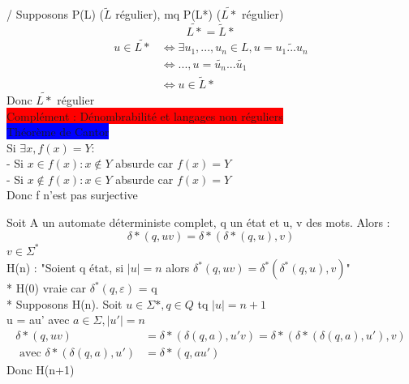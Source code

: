 \documentclass[a4paper,twocolumn,landscape]{article}
\begin{document}
/ Supposons P(L) (\(\tilde{L}\) régulier), mq P(L*) (\(\tilde{L*}\) régulier)\\
\begin{equation*}
    \tilde{L*} = \tilde{L}*
\end{equation*}
\begin{align*}
    u \in \tilde{L*} &\Leftrightarrow \exists u_1,...,u_n \in L, u = \tilde{u_1...u_n}\\
    &\Leftrightarrow ..., u = \tilde{u_n}...\tilde{u_1}\\
    &\Leftrightarrow u \in \tilde{L}*
\end{align*}
Donc \(\tilde{L*}\) régulier\\

\noindent \colorbox{red}{Complément : Dénombrabilité et langages non réguliers}\\
\colorbox{blue}{Théorème de Cantor} \\
Si \(\exists x, f(x) = Y\):\\
- Si \(x \in f(x): x\notin Y\) absurde car \(f(x) = Y\)\\
- Si \(x \notin f(x): x \in Y\) absurde car \(f(x) = Y\)\\
Donc f n'est pas surjective

\noindent
Soit A un automate déterministe complet, q un état et u, v des mots.
Alors :
\begin{equation*}
    \delta*(q, uv) = \delta*(\delta *(q, u), v)
\end{equation*}
\(v \in \Sigma^*\)\\
H(n) : "Soient q état, si \(|u| = n\) alors \(\delta^*(q,uv) = \delta^*(\delta^*(q,u),v)\)"\\
* H(0) vraie car \(\delta^*(q,\varepsilon)\) = q\\
* Supposons H(n). Soit \(u \in \Sigma*, q\in Q\) tq \(|u| = n+1\)\\
u = au' avec \(a \in \Sigma, |u'| = n\)\\
\begin{align*}
    \delta*(q,uv) &= \delta*(\delta(q,a), u'v) = \delta*(\delta*(\delta(q,a),u'),v)\\
    \text{ avec }\delta*(\delta(q,a),u') &= \delta*(q,au')
\end{align*}
Donc H(n+1)
\end{document}
